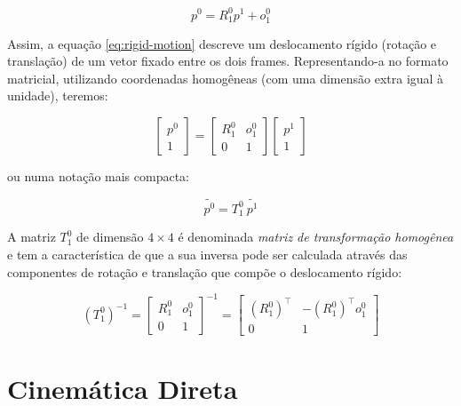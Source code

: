 \begin{equation}\label{eq:rigid-motion}
    p^0 = R_1^0 p^1 + o_1^0
\end{equation}

Assim, a equação \ref{eq:rigid-motion} descreve um deslocamento rígido 
(rotação e translação) de um vetor fixado entre os dois frames.
Representando-a no formato matricial, utilizando coordenadas
homogêneas (com uma dimensão extra igual à unidade), teremos:

\begin{equation}
    \begin{bmatrix}
        p^0 \\
        1
    \end{bmatrix} = \begin{bmatrix}
        R_1^0 & o_1^0 \\
        0     & 1
    \end{bmatrix} \begin{bmatrix}
        p^1 \\
        1
    \end{bmatrix}
\end{equation}

ou numa notação mais compacta:

\begin{equation}
    \tilde{p^0} = T_1^0 \ \tilde{p^1}
\end{equation}

A matriz \(T_1^0\) de dimensão \(4 \times 4\) é denominada
\emph{matriz de transformação homogênea} e tem a característica
de que a sua inversa pode ser calculada através das componentes
de rotação e translação que compõe o deslocamento rígido:

\begin{equation}
    {(T_1^0)}^{-1} = \begin{bmatrix}
        R_1^0 & o_1^0 \\
        0     & 1
    \end{bmatrix}^{-1} = \begin{bmatrix}
        {(R_1^0)}^{\top} & -{(R_1^0)}^{\top} o_1^0 \\
        0                & 1
    \end{bmatrix}
\end{equation}

\section{Cinemática Direta}

